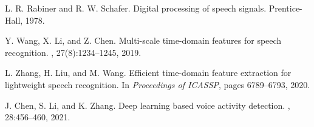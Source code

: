 \documentclass[sigconf,nonacm]{acmart}
\begin{document}
\begin{thebibliography}{9}

L. R. Rabiner and R. W. Schafer.
\newblock Digital processing of speech signals.
\newblock Prentice-Hall, 1978.

Y. Wang, X. Li, and Z. Chen.
\newblock Multi-scale time-domain features for speech recognition.
, 27(8):1234--1245, 2019.

L. Zhang, H. Liu, and M. Wang.
\newblock Efficient time-domain feature extraction for lightweight speech recognition.
\newblock In {\em Proceedings of ICASSP}, pages 6789--6793, 2020.

J. Chen, S. Li, and K. Zhang.
\newblock Deep learning based voice activity detection.
, 28:456--460, 2021.

\end{thebibliography}
\end{document}
